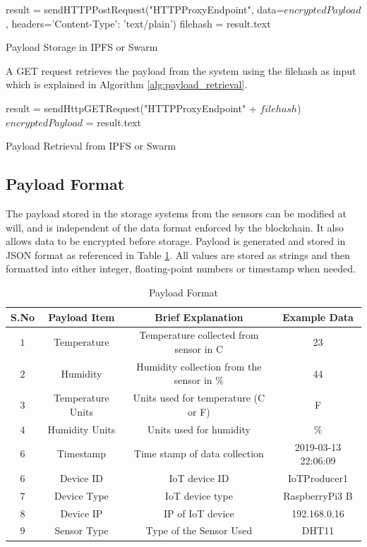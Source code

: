 \documentclass[11pt,openright]{report}
\begin{document}
\begin{algorithm}[setSwarmOrIPFSData]
  result = sendHTTPPostRequest("HTTPProxyEndpoint", data=$encryptedPayload$, headers={'Content-Type': 'text/plain'})\;
  filehash = result.text\;
 \caption{Payload Storage in IPFS or Swarm}
 \label{alg:payload_storage}
\end{algorithm}

A GET request retrieves the payload from the system using the filehash as input which is explained in Algorithm \ref{alg:payload_retrieval}.

\begin{algorithm}[getSwarmOrIPFSData]
  result = sendHttpGETRequest("HTTPProxyEndpoint" + $filehash$)\;
  $encryptedPayload$ = result.text\;
 \caption{Payload Retrieval from IPFS or Swarm}
 \label{alg:payload_retrieval}
\end{algorithm}

\subsection{Payload Format} \label{ss:payload_format}
The payload stored in the storage systems from the sensors can be modified at will, and is independent of the data format enforced by the blockchain. It also allows data to be encrypted before storage. Payload is generated and stored in JSON format as referenced in Table \ref{payload_format}. All values are stored as strings and then formatted into either integer, floating-point numbers or timestamp when needed.
\newpage

\begin{table}[!htbp]
	\renewcommand{\arraystretch}{1.3}
	\caption{Payload Format}
	\label{payload_format}
	\centering
	\begin{tabular}{|c|c|c|c|}
		\hline
		\bfseries S.No & \bfseries Payload Item & \bfseries Brief Explanation & \bfseries Example Data \\
		\hline\hline
		$1$ & Temperature & Temperature collected from sensor in C & 23 \\ \hline
		$2$ & Humidity & Humidity collection from the sensor in \% & 44 \\ \hline
		$3$ & Temperature Units & Units used for temperature (C or F) & F \\ \hline
		$4$ & Humidity Units & Units used for humidity & \% \\ \hline
		$6$ & Timestamp & Time stamp of data collection & 2019-03-13 22:06:09 \\ \hline
		$6$ & Device ID & IoT device ID & IoTProducer1 \\ \hline
		$7$ & Device Type & IoT device type & RaspberryPi3 B \\ \hline
		$8$ & Device IP & IP of IoT device& 192.168.0.16 \\ \hline
		$9$ & Sensor Type & Type of the Sensor Used & DHT11 \\ \hline
	\end{tabular}
\end{table}
\end{document}
